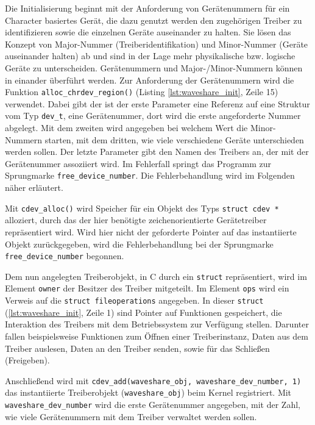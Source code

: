 Die Initialisierung beginnt mit der Anforderung von Gerätenummern für ein Character basiertes Gerät, die dazu genutzt werden den zugehörigen Treiber zu identifizieren sowie die einzelnen Geräte auseinander zu halten. Sie lösen das Konzept von Major-Nummer (Treiberidentifikation) und Minor-Nummer (Geräte auseinander halten) ab und sind in der Lage mehr physikalische bzw. logische Geräte zu unterscheiden. Gerätenummern und Major-/Minor-Nummern können in einander überführt werden. Zur Anforderung der Gerätenummern wird die Funktion \texttt{alloc_chrdev_region()} (Listing \ref{lst:waveshare_init}, Zeile 15) verwendet. Dabei gibt der ist der erste Parameter eine Referenz auf eine Struktur vom Typ \texttt{dev\_t}, eine Gerätenummer, dort wird die erste angeforderte Nummer abgelegt. Mit dem zweiten wird angegeben bei welchem Wert die Minor-Nummern starten, mit dem dritten, wie viele verschiedene Geräte unterschieden werden sollen. Der letzte Parameter gibt den Namen des Treibers an, der mit der Gerätenummer assoziiert wird. Im Fehlerfall springt das Programm zur Sprungmarke \texttt{free_device_number}. Die Fehlerbehandlung wird im Folgenden näher erläutert.

Mit \texttt{cdev_alloc()} wird Speicher für ein Objekt des Typs \texttt{struct cdev *} alloziert, durch das der hier benötigte zeichenorientierte Gerätetreiber repräsentiert wird. Wird hier nicht der geforderte Pointer auf das instantiierte Objekt zurückgegeben, wird die Fehlerbehandlung bei der Sprungmarke \texttt{free_device_number} begonnen. 

Dem nun angelegten Treiberobjekt, in C durch ein \texttt{struct} repräsentiert, wird im Element \texttt{owner} der Besitzer des Treiber mitgeteilt. Im Element \texttt{ops} wird ein Verweis auf die \texttt{struct fileoperations} angegeben. In dieser \texttt{struct} (\ref{lst:waveshare_init}, Zeile 1) sind Pointer auf Funktionen gespeichert, die Interaktion des Treibers mit dem Betriebssystem zur Verfügung stellen. Darunter fallen beispielsweise Funktionen zum Öffnen einer Treiberinstanz, Daten aus dem Treiber auslesen, Daten an den Treiber senden, sowie für das Schließen (Freigeben).  

Anschließend wird mit \texttt{cdev_add(waveshare_obj, waveshare_dev_number, 1)} das instantiierte Treiberobjekt (\texttt{waveshare\_obj}) beim Kernel registriert. Mit \texttt{waveshare\_dev\_number} wird die erste Gerätenummer angegeben, mit der Zahl, wie viele Gerätenummern mit dem Treiber verwaltet werden sollen. 

